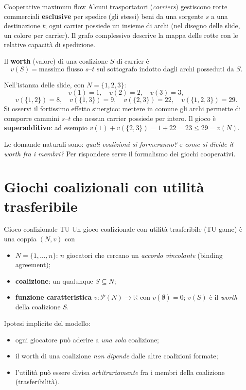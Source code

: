 \documentclass[12pt,a4paper,twoside]{book}
\theoremstyle{plain}
\theoremstyle{definition}
\begin{document}
\begin{exbox}{Cooperative maximum flow}
Alcuni trasportatori (\emph{carriers}) gestiscono rotte commerciali \textbf{esclusive} per spedire (gli stessi) beni da una sorgente $s$ a una destinazione $t$; ogni carrier possiede un insieme di archi (nel disegno delle slide, un colore per carrier). Il grafo complessivo descrive la mappa delle rotte con le relative capacità di spedizione.

Il \textbf{worth} (valore) di una coalizione $S$ di carrier è
\[ v(S)=\text{massimo flusso } s\text{--}t \text{ sul sottografo indotto dagli archi posseduti da } S. \]

Nell'istanza delle slide, con $N=\{1,2,3\}$:
\[ v(1)=1,\quad v(2)=2,\quad v(3)=3, \]
\[ v(\{1,2\})=8,\quad v(\{1,3\})=9,\quad v(\{2,3\})=22,\quad v(\{1,2,3\})=29. \]
Si osservi il fortissimo effetto sinergico: mettere in comune gli archi permette di comporre cammini $s$--$t$ che nessun carrier possiede per intero. Il gioco è \textbf{superadditivo}: ad esempio $v(1)+v(\{2,3\})=1+22=23\le 29=v(N)$.
\end{exbox}

Le domande naturali sono: \emph{quali coalizioni si formeranno?} e \emph{come si divide il worth fra i membri?} Per rispondere serve il formalismo dei giochi cooperativi.

\section{Giochi coalizionali con utilità trasferibile}

\begin{defbox}{Gioco coalizionale TU}
Un gioco coalizionale con utilità trasferibile (TU game) è una coppia $(N,v)$ con
\begin{itemize}
  \item $N=\{1,\dots,n\}$: $n$ giocatori che cercano un \emph{accordo vincolante} (binding agreement);
  \item \textbf{coalizione}: un qualunque $S\subseteq N$;
  \item \textbf{funzione caratteristica} $v:\mathcal P(N)\to\mathbb{R}$ con $v(\emptyset)=0$; $v(S)$ è il \emph{worth} della coalizione $S$.
\end{itemize}
Ipotesi implicite del modello:
\begin{itemize}
  \item ogni giocatore può aderire a \emph{una sola} coalizione;
  \item il worth di una coalizione \emph{non dipende} dalle altre coalizioni formate;
  \item l'utilità può essere divisa \emph{arbitrariamente} fra i membri della coalizione (trasferibilità).
\end{itemize}
\end{defbox}
\end{document}
